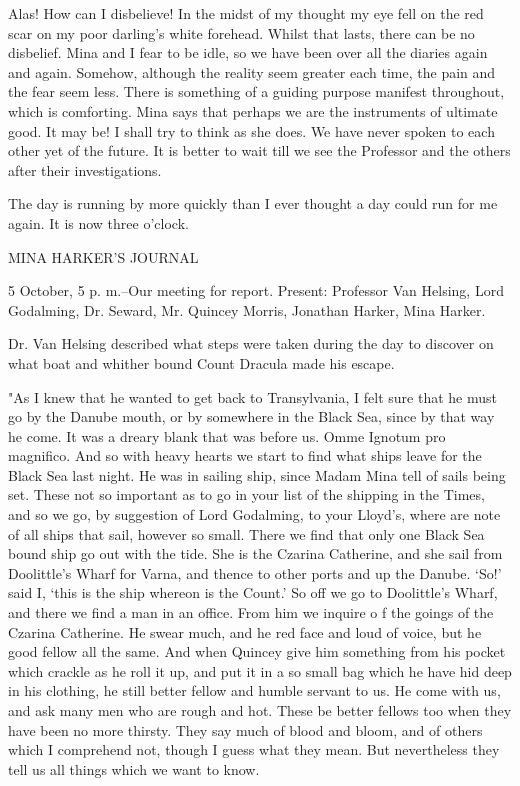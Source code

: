 Alas! How can I disbelieve! In the midst of my thought my eye fell on the red scar on my poor darling's white forehead. Whilst that lasts, there can be no disbelief. Mina and I fear to be idle, so we have been over all the diaries again and again. Somehow, although the reality seem greater each time, the pain and the fear seem less. There is something of a guiding purpose manifest throughout, which is comforting. Mina says that perhaps we are the instruments of ultimate good. It may be! I shall try to think as she does. We have never spoken to each other yet of the future. It is better to wait till we see the Professor and the others after their investigations. 

The day is running by more quickly than I ever thought a day could run for me again. It is now three o'clock. 

MINA HARKER'S JOURNAL 

5 October, 5 p. m.--Our meeting for report. Present: Professor Van Helsing, Lord Godalming, Dr. Seward, Mr. Quincey Morris, Jonathan Harker, Mina Harker. 

Dr. Van Helsing described what steps were taken during the day to discover on what boat and whither bound Count Dracula made his escape. 

"As I knew that he wanted to get back to Transylvania, I felt sure that he must go by the Danube mouth, or by somewhere in the Black Sea, since by that way he come. It was a dreary blank that was before us. Omme Ignotum pro magnifico. And so with heavy hearts we start to find what ships leave for the Black Sea last night. He was in sailing ship, since Madam Mina tell of sails being set. These not so important as to go in your list of the shipping in the Times, and so we go, by suggestion of Lord Godalming, to your Lloyd's, where are note of all ships that sail, however so small. There we find that only one Black Sea bound ship go out with the tide. She is the Czarina Catherine, and she sail from Doolittle's Wharf for Varna, and thence to other ports and up the Danube. `So!' said I, `this is the ship whereon is the Count.' So off we go to Doolittle's Wharf, and there we find a man in an office. From him we inquire o f the goings of the Czarina Catherine. He swear much, and he red face and loud of voice, but he good fellow all the same. And when Quincey give him something from his pocket which crackle as he roll it up, and put it in a so small bag which he have hid deep in his clothing, he still better fellow and humble servant to us. He come with us, and ask many men who are rough and hot. These be better fellows too when they have been no more thirsty. They say much of blood and bloom, and of others which I comprehend not, though I guess what they mean. But nevertheless they tell us all things which we want to know. 

